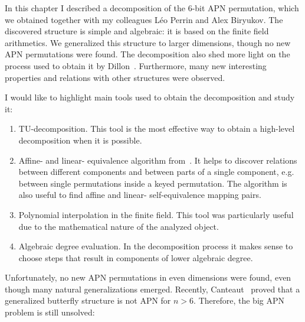 
In this chapter I described a decomposition of the 6-bit APN permutation, which we obtained together with my colleagues Léo Perrin and Alex Biryukov. The discovered structure is simple and algebraic: it is based on the finite field arithmetics. We generalized this structure to larger dimensions, though no new APN permutations were found. The decomposition also shed more light on the process used to obtain it by Dillon~\etal{}. Furthermore, many new interesting properties and relations with other structures were observed.

I would like to highlight main tools used to obtain the decomposition and study it:
\begin{enumerate}
    \item TU-decomposition. This tool is the most effective way to obtain a high-level decomposition when it is possible.
    \item Affine- and linear- equivalence algorithm from~\cite{LinAffEQ}. It helps to discover relations between different components and between parts of a single component, e.g. between single permutations inside a keyed permutation. The algorithm is also useful to find affine and linear- self-equivalence mapping pairs. 
    \item Polynomial interpolation in the finite field. This tool was particularly useful due to the mathematical nature of the analyzed object.
    \item Algebraic degree evaluation. In the decomposition process it makes sense to choose steps that result in components of lower algebraic degree.
\end{enumerate}

Unfortunately, no new APN permutations in even dimensions were found, even though many natural generalizations emerged. Recently, Canteaut~\etal{} proved that a generalized butterfly structure is not APN for $n > 6$. Therefore, the big APN problem is still unsolved:


